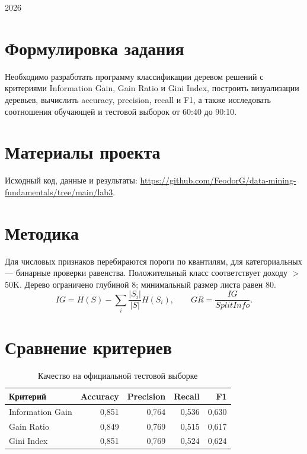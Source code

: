 \documentclass[12pt,a4paper]{article}
\begin{document}
\begin{titlepage}\centering
\vspace*{3cm}{\Huge\bfseries ОТЧЁТ О ВЫПОЛНЕНИИ ЗАДАНИЯ\par}
\vspace{1cm}{\LARGE\bfseries Классификация с помощью\\дерева решений\par}
\vspace{3cm}\vfill 2026
\end{titlepage}

\section{Формулировка задания}
Необходимо разработать программу классификации деревом решений с критериями Information Gain, Gain Ratio и Gini Index, построить визуализации деревьев, вычислить accuracy, precision, recall и F1, а также исследовать соотношения обучающей и тестовой выборок от 60:40 до 90:10.

\section{Материалы проекта}
Исходный код, данные и результаты: \url{https://github.com/FeodorG/data-mining-fundamentals/tree/main/lab3}.

\section{Методика}
Для числовых признаков перебираются пороги по квантилям, для категориальных --- бинарные проверки равенства. Положительный класс соответствует доходу $>$50K. Дерево ограничено глубиной 8; минимальный размер листа равен 80.
\[
IG=H(S)-\sum_i\frac{|S_i|}{|S|}H(S_i),\qquad
GR=\frac{IG}{SplitInfo}.
\]

\section{Сравнение критериев}
\begin{table}[H]\centering
\caption{Качество на официальной тестовой выборке}
\begin{tabular}{lrrrr}\toprule
Критерий & Accuracy & Precision & Recall & F1\\\midrule
Information Gain & 0{,}851 & 0{,}764 & 0{,}536 & 0{,}630\\
Gain Ratio & 0{,}849 & 0{,}769 & 0{,}515 & 0{,}617\\
Gini Index & 0{,}851 & 0{,}769 & 0{,}524 & 0{,}624\\\bottomrule
\end{tabular}\end{table}
\end{document}

